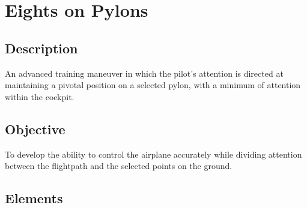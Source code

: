 \section{Eights on Pylons}

\subsection{Description}

An advanced training maneuver in which the pilot's attention is directed at
maintaining a pivotal position on a selected pylon, with a minimum of attention
within the cockpit.

\subsection{Objective}

To develop the ability to control the airplane accurately while dividing
attention between the flightpath and the selected points on the ground. 

\subsection{Elements}

